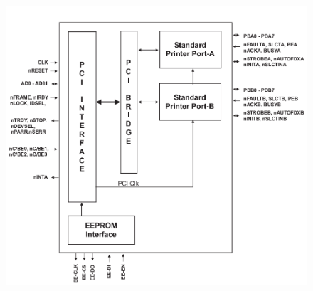 \documentclass[a4paper,11pt]{article}
\begin{document}
\begin{figure}[h]
 \centering
 \includegraphics[bb=0 0 724 671,scale=0.5]{./pics/mcs9815_block_diagram.png}
\end{figure}



\end{document}
